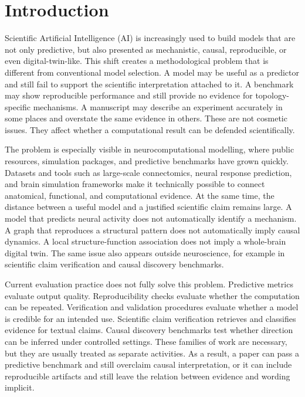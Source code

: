 \section{Introduction}
\label{sec:introduction}

Scientific Artificial Intelligence (AI) is increasingly used to build models that are not only predictive, but also presented as mechanistic, causal, reproducible, or even digital-twin-like. This shift creates a methodological problem that is different from conventional model selection. A model may be useful as a predictor and still fail to support the scientific interpretation attached to it. A benchmark may show reproducible performance and still provide no evidence for topology-specific mechanisms. A manuscript may describe an experiment accurately in some places and overstate the same evidence in others. These are not cosmetic issues. They affect whether a computational result can be defended scientifically.

The problem is especially visible in neurocomputational modelling, where public resources, simulation packages, and predictive benchmarks have grown quickly. Datasets and tools such as large-scale connectomics, neural response prediction, and brain simulation frameworks make it technically possible to connect anatomical, functional, and computational evidence. At the same time, the distance between a useful model and a justified scientific claim remains large. A model that predicts neural activity does not automatically identify a mechanism. A graph that reproduces a structural pattern does not automatically imply causal dynamics. A local structure-function association does not imply a whole-brain digital twin. The same issue also appears outside neuroscience, for example in scientific claim verification and causal discovery benchmarks.

Current evaluation practice does not fully solve this problem. Predictive metrics evaluate output quality. Reproducibility checks evaluate whether the computation can be repeated. Verification and validation procedures evaluate whether a model is credible for an intended use. Scientific claim verification retrieves and classifies evidence for textual claims. Causal discovery benchmarks test whether direction can be inferred under controlled settings. These families of work are necessary, but they are usually treated as separate activities. As a result, a paper can pass a predictive benchmark and still overclaim causal interpretation, or it can include reproducible artifacts and still leave the relation between evidence and wording implicit.

